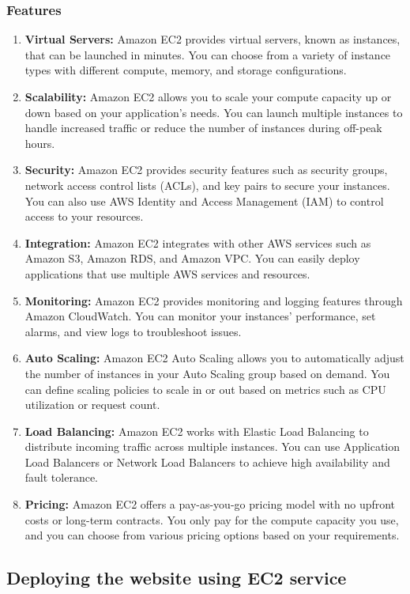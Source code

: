 \documentclass[11pt]{article}
\begin{document}
\subsubsection{Features}
\begin{enumerate}
    \item \textbf{Virtual Servers:} Amazon EC2 provides virtual servers, known as instances, that can be launched in minutes. You can choose from a variety of instance types with different compute, memory, and storage configurations.
    \item \textbf{Scalability:} Amazon EC2 allows you to scale your compute capacity up or down based on your application's needs. You can launch multiple instances to handle increased traffic or reduce the number of instances during off-peak hours.
    \item \textbf{Security:} Amazon EC2 provides security features such as security groups, network access control lists (ACLs), and key pairs to secure your instances. You can also use AWS Identity and Access Management (IAM) to control access to your resources.
    \item \textbf{Integration:} Amazon EC2 integrates with other AWS services such as Amazon S3, Amazon RDS, and Amazon VPC. You can easily deploy applications that use multiple AWS services and resources.
    \item \textbf{Monitoring:} Amazon EC2 provides monitoring and logging features through Amazon CloudWatch. You can monitor your instances' performance, set alarms, and view logs to troubleshoot issues.
    \item \textbf{Auto Scaling:} Amazon EC2 Auto Scaling allows you to automatically adjust the number of instances in your Auto Scaling group based on demand. You can define scaling policies to scale in or out based on metrics such as CPU utilization or request count.
    \item \textbf{Load Balancing:} Amazon EC2 works with Elastic Load Balancing to distribute incoming traffic across multiple instances. You can use Application Load Balancers or Network Load Balancers to achieve high availability and fault tolerance.
    \item \textbf{Pricing:} Amazon EC2 offers a pay-as-you-go pricing model with no upfront costs or long-term contracts. You only pay for the compute capacity you use, and you can choose from various pricing options based on your requirements.
\end{enumerate}

\subsection{Deploying the website using EC2 service}
\end{document}
